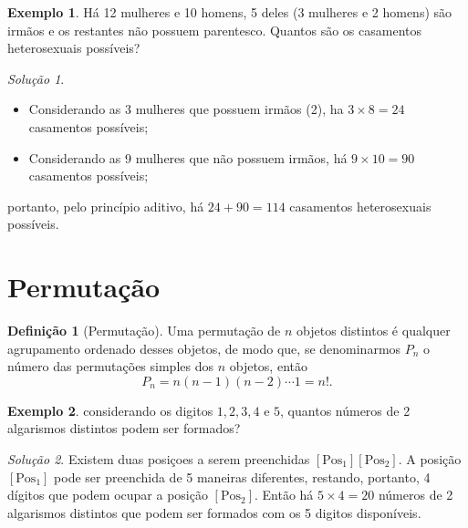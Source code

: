 \documentclass[]{book}
\providecommand{\tightlist}{%
  \setlength{\itemsep}{0pt}\setlength{\parskip}{0pt}}
\theoremstyle{definition}
\newtheorem{definition}{Definição}[chapter]
\theoremstyle{definition}
\newtheorem{example}{Exemplo}[chapter]
\theoremstyle{definition}
\theoremstyle{remark}
\newtheorem*{solution}{Solução}
\begin{document}
\begin{example}
\protect\hypertarget{exm:unnamed-chunk-24}{}{\label{exm:unnamed-chunk-24} }Há 12 mulheres e 10 homens, 5 deles (3 mulheres e 2 homens) são irmãos e os restantes não possuem parentesco.
Quantos são os casamentos heterosexuais possíveis?
\end{example}

\begin{solution}
\iffalse{} {Solução. } \fi{}

\begin{itemize}
\tightlist
\item
  Considerando as 3 mulheres que possuem irmãos (2), ha \(3\times 8=24\) casamentos possíveis;
\item
  Considerando as 9 mulheres que não possuem irmãos, há \(9\times 10=90\) casamentos possíveis;
\end{itemize}

portanto, pelo princípio aditivo, há \(24+90 = 114\) casamentos heterosexuais possíveis.
\end{solution}

\hypertarget{permutauxe7uxe3o}{%
\section{Permutação}\label{permutauxe7uxe3o}}

\begin{definition}[Permutação]
\protect\hypertarget{def:defPermutacao}{}{\label{def:defPermutacao} \iffalse (Permutação) \fi{} }Uma permutação de \(n\) objetos distintos é qualquer agrupamento ordenado desses objetos, de modo que, se denominarmos \(P_n\) o número das permutações simples dos \(n\) objetos, então
\[P_n = n(n-1)(n-2)\cdots 1 = n!.\]
\end{definition}

\begin{example}
\protect\hypertarget{exm:exPosicoes}{}{\label{exm:exPosicoes} }considerando os digitos \(1, 2, 3, 4\) e \(5\), quantos números de 2 algarismos distintos podem ser formados?
\end{example}

\begin{solution}
\iffalse{} {Solução. } \fi{}Existem duas posiçoes a serem preenchidas \([\text{Pos}_1][\text{Pos}_2]\).
A posição \([\text{Pos}_1]\) pode ser preenchida de 5 maneiras diferentes, restando, portanto, 4 dígitos que podem ocupar a posição \([\text{Pos}_2]\).
Então há \(5\times 4 = 20\) números de 2 algarismos distintos que podem ser formados com os 5 digitos disponíveis.
\end{solution}
\end{document}
